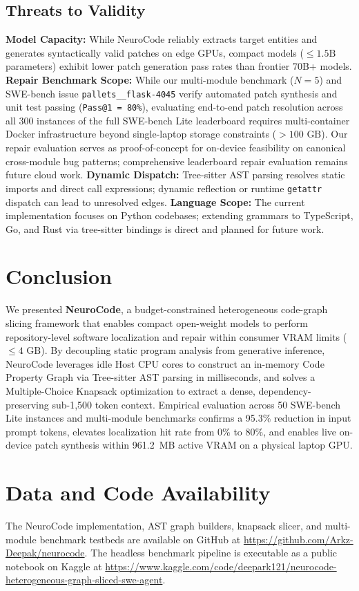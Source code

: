 \documentclass[conference]{IEEEtran}
\begin{document}
\subsection{Threats to Validity}
\textbf{Model Capacity:} While NeuroCode reliably extracts target entities and generates syntactically valid patches on edge GPUs, compact models ($\le 1.5\text{B}$ parameters) exhibit lower patch generation pass rates than frontier 70B+ models. \textbf{Repair Benchmark Scope:} While our multi-module benchmark ($N=5$) and SWE-bench issue \texttt{pallets\_\_flask-4045} verify automated patch synthesis and unit test passing (\texttt{Pass@1 = 80\%}), evaluating end-to-end patch resolution across all 300 instances of the full SWE-bench Lite leaderboard requires multi-container Docker infrastructure beyond single-laptop storage constraints ($>100\text{ GB}$). Our repair evaluation serves as proof-of-concept for on-device feasibility on canonical cross-module bug patterns; comprehensive leaderboard repair evaluation remains future cloud work. \textbf{Dynamic Dispatch:} Tree-sitter AST parsing resolves static imports and direct call expressions; dynamic reflection or runtime \texttt{getattr} dispatch can lead to unresolved edges. \textbf{Language Scope:} The current implementation focuses on Python codebases; extending grammars to TypeScript, Go, and Rust via tree-sitter bindings is direct and planned for future work.

\section{Conclusion}
We presented \textbf{NeuroCode}, a budget-constrained heterogeneous code-graph slicing framework that enables compact open-weight models to perform repository-level software localization and repair within consumer VRAM limits ($\le 4\text{ GB}$). By decoupling static program analysis from generative inference, NeuroCode leverages idle Host CPU cores to construct an in-memory Code Property Graph via Tree-sitter AST parsing in milliseconds, and solves a Multiple-Choice Knapsack optimization to extract a dense, dependency-preserving sub-1,500 token context. Empirical evaluation across 50 SWE-bench Lite instances and multi-module benchmarks confirms a 95.3\% reduction in input prompt tokens, elevates localization hit rate from 0\% to 80\%, and enables live on-device patch synthesis within 961.2~MB active VRAM on a physical laptop GPU.

\section*{Data and Code Availability}
The NeuroCode implementation, AST graph builders, knapsack slicer, and multi-module benchmark testbeds are available on GitHub at \url{https://github.com/Arkz-Deepak/neurocode}. The headless benchmark pipeline is executable as a public notebook on Kaggle at \url{https://www.kaggle.com/code/deepark121/neurocode-heterogeneous-graph-sliced-swe-agent}.
\end{document}
